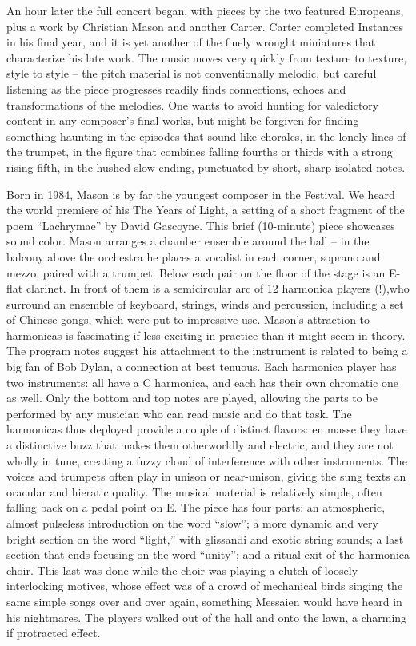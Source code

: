 An hour later the full concert began, with pieces by the two featured Europeans, plus a work by Christian Mason and another Carter. Carter completed Instances in his final year, and it is yet another of the finely wrought miniatures that characterize his late work. The music moves very quickly from texture to texture, style to style – the pitch material is not conventionally melodic, but careful listening as the piece progresses readily finds connections, echoes and transformations of the melodies. One wants to avoid hunting for valedictory content in any composer’s final works, but might be forgiven for finding something haunting in the episodes that sound like chorales, in the lonely lines of the trumpet, in the figure that combines falling fourths or thirds with a strong rising fifth, in the hushed slow ending, punctuated by short, sharp isolated notes.

Born in 1984, Mason is by far the youngest composer in the Festival. We heard the world premiere of his The Years of Light, a setting of a short fragment of the poem “Lachrymae” by David Gascoyne. This brief (10-minute) piece showcases sound color. Mason arranges a chamber ensemble around the hall – in the balcony above the orchestra he places a vocalist in each corner, soprano and mezzo, paired with a trumpet. Below each pair on the floor of the stage is an E-flat clarinet. In front of them is a semicircular arc of 12 harmonica players (!),who surround an ensemble of keyboard, strings, winds and percussion, including a set of Chinese gongs, which were put to impressive use. Mason’s attraction to harmonicas is fascinating if less exciting in practice than it might seem in theory. The program notes suggest his attachment to the instrument is related to being a big fan of Bob Dylan, a connection at best tenuous. Each harmonica player has two instruments: all have a C harmonica, and each has their own chromatic one as well. Only the bottom and top notes are played, allowing the parts to be performed by any musician who can read music and do that task. The harmonicas thus deployed provide a couple of distinct flavors: en masse they have a distinctive buzz that makes them otherworldly and electric, and they are not wholly in tune, creating a fuzzy cloud of interference with other instruments. The voices and trumpets often play in unison or near-unison, giving the sung texts an oracular and hieratic quality. The musical material is relatively simple, often falling back on a pedal point on E. The piece has four parts: an atmospheric, almost pulseless introduction on the word “slow”; a more dynamic and very bright section on the word “light,” with glissandi and exotic string sounds; a last section that ends focusing on the word “unity”; and a ritual exit of the harmonica choir. This last was done while the choir was playing a clutch of loosely interlocking motives, whose effect was of a crowd of mechanical birds singing the same simple songs over and over again, something Messaien would have heard in his nightmares. The players walked out of the hall and onto the lawn, a charming if protracted effect.

